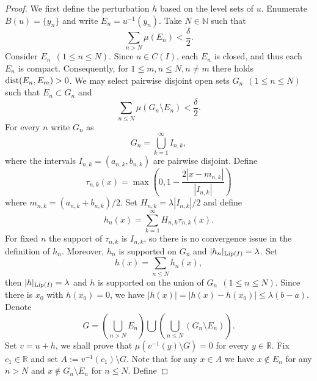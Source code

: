 \documentclass{amsart}
\numberwithin{equation}{section}
\begin{document}
\begin{proof}
    We first define the perturbation $h$ based on the level sets of $u$. Enumerate $B(u)=\{y_n\}$ and write $E_n=u^{-1}(y_n)$. Take $N\in\mathbb{N}$ such that
    \begin{equation}
        \nonumber
        \sum_{n>N}\mu(E_n)<\frac{\delta}{2}.
    \end{equation}
    Consider $E_n~~(1\le n\le N)$.
    Since $u\in C(I)$, each $E_n$ is closed, and thus each $E_n$ is compact. Consequently, for $1\le m,n\le N, n\neq m$ there holds ${\rm dist}(E_n,E_m)>0$. We may select pairwise disjoint open sets $G_n~~(1\le n\le N)$ such that $E_n\subset G_n$ and 
    \begin{equation}
        \nonumber
        \sum_{n\le N}\mu(G_n\setminus E_n)<\frac{\delta}{2}.
    \end{equation}
    For every $n$ write $G_n$ as
    \begin{equation}
        \nonumber
        G_n=\bigcup_{k=1}^\infty I_{n,k},
    \end{equation}
    where the intervals $I_{n,k}=(a_{n,k},b_{n,k})$ are pairwise disjoint. Define 
    $$
    \tau_{n,k}(x)=\max\left(0,1-\frac{2|x-m_{n,k}|}{|I_{n,k}|}\right)
    $$
    where $m_{n,k}=(a_{n,k}+b_{n,k})/2$. Set $H_{n,k}=\lambda|I_{n,k}|/2$ and define
    \begin{equation}
        \nonumber
        h_n(x)=\sum_{k=1}^\infty H_{n,k}\tau_{n,k}(x).
    \end{equation}
    For fixed $n$ the support of $\tau_{n,k}$ is $I_{n,k}$, so there is no convergence issue in the definition of $h_n$. Moreover, $h_n$ is supported on $G_n$ and $|h_n|_{{\rm Lip}(I)}=\lambda$.
    Set
    \begin{equation}
        \nonumber
        h(x)=\sum_{n\le N}h_n(x),
    \end{equation}
    then $|h|_{{\rm Lip}(I)}=\lambda$ and $h$ is supported on the union of $G_n~~(1\le n\le N)$. Since there is $x_0$ with $h(x_0)=0$, we have $|h(x)|=|h(x)-h(x_0)|\le\lambda(b-a)$. Denote
    \begin{equation}
        \nonumber
        G=\left(\bigcup_{n>N}E_n\right)\bigcup\left(\bigcup_{n\le N}(G_n\setminus E_n)\right).
    \end{equation}
    Set $v=u+h$, we shall prove that $\mu(v^{-1}(y)\setminus G)=0$ for every $y\in\mathbb{R}$. Fix $c_1\in\mathbb{R}$ and set $A:=v^{-1}(c_1)\setminus G$.
    Note that for any $x\in A$ we have $x\notin E_n$ for any $n>N$ and $x\notin G_n\setminus E_n$ for $n\le N$. Define

\end{proof}
\end{document}
